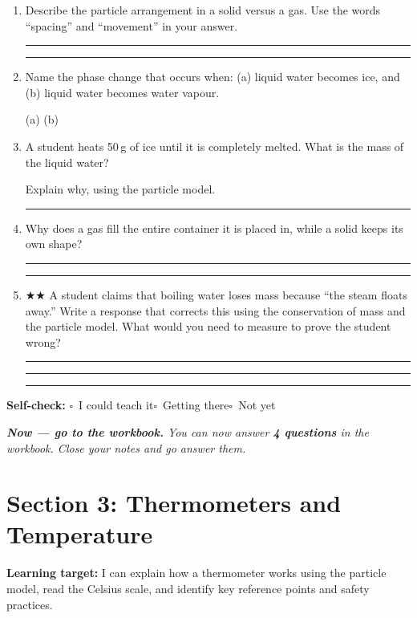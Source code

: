 \documentclass[11pt, a4paper]{article}
\newcommand{\blank}[1]{\underline{\hspace{#1}}}
\newcommand{\answerline}{\par\vspace{0.45cm}\noindent\rule{\linewidth}{0.4pt}\par\vspace{0.1cm}}
\newcommand{\selfcheck}{\par\smallskip\noindent\textbf{Self-check:}
  $\square$~I could teach it\quad$\square$~Getting there\quad$\square$~Not yet\smallskip}
\begin{document}
\begin{tcolorbox}[retrieval]
\begin{enumerate}
  \item Describe the particle arrangement in a solid versus a gas. Use the words ``spacing'' and ``movement'' in your answer.
  \answerline\answerline

  \item Name the phase change that occurs when: (a) liquid water becomes ice, and (b) liquid water becomes water vapour.

  (a) \blank{4.5cm} \qquad (b) \blank{4.5cm}

  \item A student heats 50\,g of ice until it is completely melted. What is the mass of the liquid water?

  \blank{3cm}

  Explain why, using the particle model.
  \answerline

  \item Why does a gas fill the entire container it is placed in, while a solid keeps its own shape?
  \answerline\answerline

  \item $\bigstar\bigstar$ A student claims that boiling water loses mass because ``the steam floats away.'' Write a response that corrects this using the conservation of mass and the particle model. What would you need to measure to prove the student wrong?
  \answerline\answerline\answerline
\end{enumerate}
\end{tcolorbox}

\selfcheck

\smallskip
\noindent\textit{\textbf{Now --- go to the workbook.} You can now answer \textbf{4 questions} in the workbook. Close your notes and go answer them.}

\clearpage

\section{Section 3: Thermometers and Temperature}

\begin{tcolorbox}[learningtarget]
\textbf{Learning target:} I can explain how a thermometer works using the particle model, read the Celsius scale, and identify key reference points and safety practices.
\end{tcolorbox}
\end{document}
